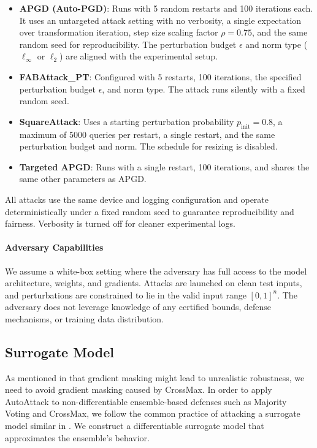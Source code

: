 \begin{itemize}
    \item \textbf{APGD (Auto-PGD)}: Runs with 5 random restarts and 100 iterations each. It uses an untargeted attack setting with no verbosity, a single expectation over transformation iteration, step size scaling factor \(\rho = 0.75\), and the same random seed for reproducibility. The perturbation budget \(\epsilon\) and norm type (\(\ell_\infty\) or \(\ell_2\)) are aligned with the experimental setup.
    
    \item \textbf{FABAttack\_PT}: Configured with 5 restarts, 100 iterations, the specified perturbation budget \(\epsilon\), and norm type. The attack runs silently with a fixed random seed.
    
    \item \textbf{SquareAttack}: Uses a starting perturbation probability \(p_{\text{init}}=0.8\), a maximum of 5000 queries per restart, a single restart, and the same perturbation budget and norm. The schedule for resizing is disabled.
    
    \item \textbf{Targeted APGD}: Runs with a single restart, 100 iterations, and shares the same other parameters as APGD.
\end{itemize}

All attacks use the same device and logging configuration and operate deterministically under a fixed random seed to guarantee reproducibility and fairness. Verbosity is turned off for cleaner experimental logs.


\paragraph{Adversary Capabilities}

We assume a white-box setting where the adversary has full access to the model architecture, weights, and gradients. Attacks are launched on clean test inputs, and perturbations are constrained to lie in the valid input range $[0,1]^n$. The adversary does not leverage knowledge of any certified bounds, defense mechanisms, or training data distribution.

\subsection{Surrogate Model}
\label{sec:surrogate model}
\indent

As mentioned in \cite{zhang2024evaluating} that gradient masking might lead to unrealistic robustness, we need to avoid gradient masking caused by CrossMax. In order to apply AutoAttack to non-differentiable ensemble-based defenses such as Majority Voting and CrossMax, we follow the common practice of attacking a surrogate model similar in \cite{zhang2024evaluating}. We construct a differentiable surrogate model that approximates the ensemble’s behavior.

